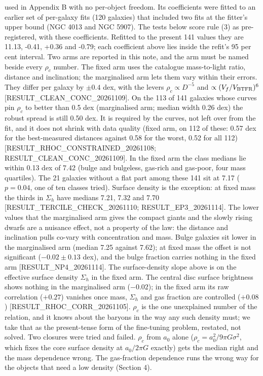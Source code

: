 \documentclass[
  10pt,
]{article}
\begin{document}
used in Appendix B with no per-object freedom. Its coefficients were fitted to an earlier set of per-galaxy fits (120 galaxies) that included two fits at the fitter's upper bound (NGC 4013 and NGC 5907). The tests below score rule (3) as pre-registered, with these coefficients. Refitted to the present 141 values they are 11.13, -0.41, +0.36 and -0.79; each coefficient above lies inside the refit's 95 per cent interval. Two arms are reported in this note, and the arm must be named beside every $\rho_c$ number. The fixed arm uses the catalogue mass-to-light ratio, distance and inclination; the marginalised arm lets them vary within their errors. They differ per galaxy by $\pm0.4$ dex, with the levers $\rho_c\propto D^{-5}$ and $\propto(V_f/V_{\rm BTFR})^{6}$ {[}RESULT\_CLEAN\_CONC\_20261109{]}. On the 113 of 141 galaxies whose curves pin $\rho_c$ to better than 0.5 dex (marginalised arm; median width 0.26 dex) the robust spread is still 0.50 dex. It is required by the curves, not left over from the fit, and it does not shrink with data quality (fixed arm, on 112 of these: 0.57 dex for the best-measured distances against 0.58 for the worst, 0.52 for all 112) {[}RESULT\_RHOC\_CONSTRAINED\_20261108; RESULT\_CLEAN\_CONC\_20261109{]}. In the fixed arm the class medians lie within 0.13 dex of 7.42 (bulge and bulgeless, gas-rich and gas-poor, four mass quartiles). The 21 galaxies without a flat part among these 141 sit at 7.17 ($p=0.04$, one of ten classes tried). Surface density is the exception: at fixed mass the thirds in $\Sigma_h$ have medians 7.21, 7.32 and 7.70 {[}RESULT\_TERCILE\_CHECK\_20261110; RESULT\_EP3\_20261114{]}. The lower values that the marginalised arm gives the compact giants and the slowly rising dwarfs are a nuisance effect, not a property of the law: the distance and inclination pulls co-vary with concentration and mass. Bulge galaxies sit lower in the marginalised arm (median 7.25 against 7.62); at fixed mass the offset is not significant ($-0.02\pm0.13$ dex), and the bulge fraction carries nothing in the fixed arm {[}RESULT\_NP4\_20261114{]}. The surface-density slope above is on the effective surface density $\Sigma_h$ in the fixed arm. The central disc surface brightness shows nothing in the marginalised arm ($-0.02$); in the fixed arm its raw correlation ($+0.27$) vanishes once mass, $\Sigma_h$ and gas fraction are controlled ($+0.08$) {[}RESULT\_RHOC\_CORR\_20261105{]}. $\rho_c$ is the one unexplained number of the relation, and it knows about the baryons in the way any such density must; we take that as the present-tense form of the fine-tuning problem, restated, not solved. Two closures were tried and failed. $\rho_c$ from $a_0$ alone ($\rho_c=a_0^2/9\pi G\sigma^2$, which fixes the core surface density at $a_0/2\pi G$ exactly) gets the median right and the mass dependence wrong. The gas-fraction dependence runs the wrong way for the objects that need a low density (Section 4).
\end{document}
